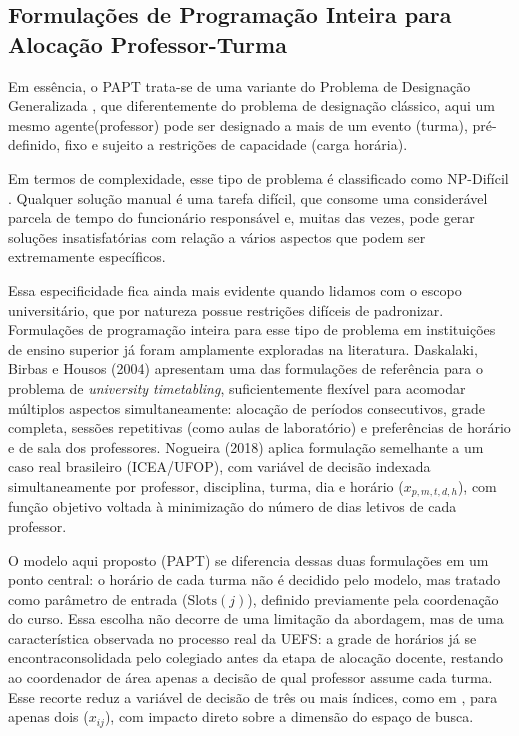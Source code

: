 \documentclass[11pt,a4paper]{article}
\begin{document}
\subsection{Formulações de Programação Inteira para Alocação Professor-Turma}


Em essência, o PAPT trata-se de uma variante do Problema de Designação Generalizada \cite{arenales2007pesquisa}, que diferentemente do problema de designação clássico, aqui um mesmo agente(professor) pode ser designado a mais de um evento (turma), pré-definido, fixo e sujeito a restrições de capacidade (carga horária). 

Em termos de complexidade, esse tipo de problema é classificado como NP-Difícil \cite{martellototh1990}. Qualquer solução manual é uma tarefa difícil, que consome uma considerável parcela de tempo do funcionário responsável e, muitas das vezes, pode gerar soluções insatisfatórias com relação a vários aspectos que podem ser extremamente específicos.

Essa especificidade fica ainda mais evidente quando lidamos com o escopo universitário, que por natureza possue restrições difíceis de padronizar. Formulações de programação inteira para esse tipo de problema em instituições de ensino superior já foram amplamente exploradas na literatura. Daskalaki, Birbas e Housos (2004) \cite{daskalaki2004} apresentam uma das formulações de referência para o problema de \emph{university timetabling}, suficientemente flexível para acomodar múltiplos aspectos simultaneamente: alocação de períodos consecutivos, grade completa, sessões repetitivas (como aulas de laboratório) e preferências de horário e de sala dos professores. Nogueira (2018) \cite{nogueira2018} aplica formulação semelhante a um caso real brasileiro (ICEA/UFOP), com variável de decisão indexada simultaneamente por
professor, disciplina, turma, dia e horário ($x_{p,m,t,d,h}$), com função objetivo voltada à minimização do número de dias letivos de cada professor.

O modelo aqui proposto (PAPT) se diferencia dessas duas formulações em um
ponto central: o horário de cada turma não é decidido pelo modelo, mas tratado como parâmetro de entrada ($\text{Slots}(j)$), definido previamente pela coordenação do curso. Essa escolha não decorre de uma limitação da abordagem, mas de uma característica observada no processo real da UEFS: a grade de horários já se encontraconsolidada pelo colegiado antes da etapa de alocação docente, restando ao coordenador
de área apenas a decisão de qual professor assume cada turma. Esse recorte reduz a variável de decisão de três ou mais índices, como em \cite{nogueira2018}, para apenas dois ($x_{ij}$), com impacto direto sobre a dimensão do espaço de busca.
\end{document}

